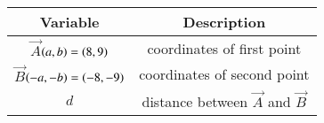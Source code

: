 \begin{tabular}[12pt]{ |c| c|}
    \hline
	\textbf{Variable}  & \textbf{Description} \\
    \hline
	$\vec{A}$$\left(a,b\right)=\left(8,9\right)$ &  coordinates of first point\\
    \hline 
	$\vec{B}$$\left(-a,-b\right)=\left(-8,-9\right)$ & coordinates of second point\\
    \hline
	$d$ & distance between $\vec A$ and $\vec B$\\
    \hline 	
         
\end{tabular}
